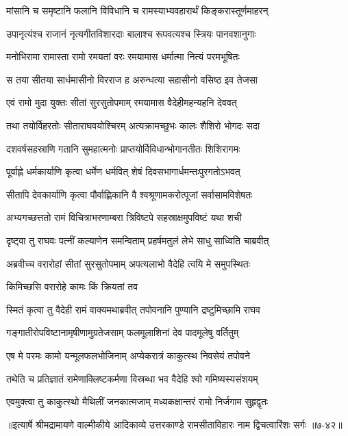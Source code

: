 \twolineshloka
{मांसानि च समृष्टानि फलानि विविधानि च}
{रामस्याभ्यवहारार्थं किङ्करास्तूर्णमाहरन्} %

\twolineshloka
{उपानृत्यंश्च राजानं नृत्यगीतविशारदाः}
{बालाश्च रूपवत्यश्च स्त्रियः पानवशानुगाः} %

\twolineshloka
{मनोभिरामा रामास्ता रामो रमयतां वरः}
{रमयामास धर्मात्मा नित्यं परमभूषितः} %

\twolineshloka
{स तया सीतया सार्धमासीनो विरराज ह}
{अरुन्धत्या सहासीनो वसिष्ठ इव तेजसा} %

\twolineshloka
{एवं रामो मुदा युक्तः सीतां सुरसुतोपमाम्}
{रमयामास वैदेहीमहन्यहनि देववत्} %

\twolineshloka
{तथा तयोर्विहरतोः सीताराघवयोश्चिरम्}
{अत्यक्रामच्छुभः कालः शैशिरो भोगदः सदा} %

\twolineshloka
{दशवर्षसहस्राणि गतानि सुमहात्मनोः}
{प्राप्तयोर्विविधान्भोगानतीतः शिशिरागमः} %

\twolineshloka
{पूर्वाह्णे धर्मकार्याणि कृत्वा धर्मेण धर्मवित्}
{शेषं दिवसभागार्धमन्तःपुरगतोऽभवत्} %

\twolineshloka
{सीतापि देवकार्याणि कृत्वा पौर्वाह्णिकानि वै}
{श्वश्रूणामकरोत्पूजां सर्वासामविशेषतः} %

\twolineshloka
{अभ्यगच्छत्ततो रामं विचित्राभरणाम्बरा}
{त्रिविष्टपे सहस्राक्षमुपविष्टं यथा शची} %

\twolineshloka
{दृष्ट्वा तु राघवः पत्नीं कल्याणेन समन्विताम्}
{प्रहर्षमतुलं लेभे साधु साध्विति चाब्रवीत्} %

\twolineshloka
{अब्रवीच्च वरारोहां सीतां सुरसुतोपमाम्}
{अपत्यलाभो वैदेहि त्वयि मे समुपस्थितः} %

\onelineshloka
{किमिच्छसि वरारोहे कामः किं क्रियतां तव} %

\twolineshloka
{स्मितं कृत्वा तु वैदेही रामं वाक्यमथाब्रवीत्}
{तपोवनानि पुण्यानि द्रष्टुमिच्छामि राघव} %

\twolineshloka
{गङ्गातीरोपविष्टानामृषीणामुग्रतेजसाम्}
{फलमूलाशिनां देव पादमूलेषु वर्तितुम्} %

\twolineshloka
{एष मे परमः कामो यन्मूलफलभोजिनाम्}
{अप्येकरात्रं काकुत्स्थ निवसेयं तपोवने} %

\twolineshloka
{तथेति च प्रतिज्ञातं रामेणाक्लिष्टकर्मणा}
{विस्रब्धा भव वैदेहि श्वो गमिष्यस्यसंशयम्} %

\twolineshloka
{एवमुक्त्वा तु काकुत्स्थो मैथिलीं जनकात्मजाम्}
{मध्यकक्षान्तरं रामो निर्जगाम सुहृद्वृतः} %


॥इत्यार्षे श्रीमद्रामायणे वाल्मीकीये आदिकाव्ये उत्तरकाण्डे रामसीताविहारः नाम द्विचत्वारिंशः सर्गः ॥७-४२॥
